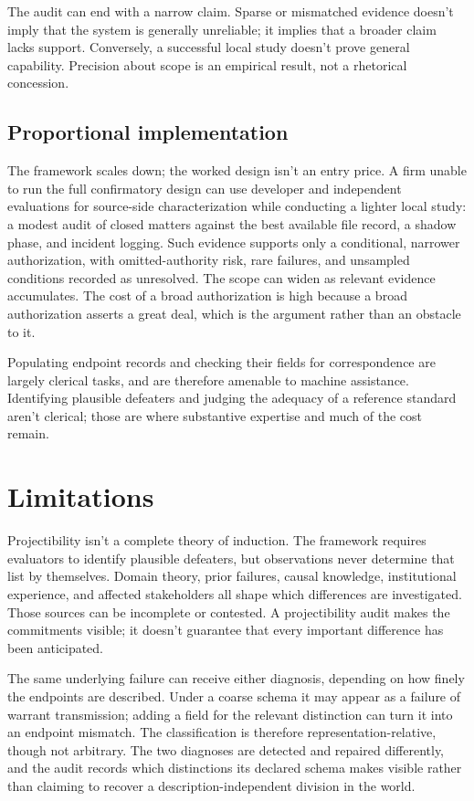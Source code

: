 \documentclass[12pt]{article}
\begin{document}
The audit can end with a narrow claim. Sparse or mismatched evidence doesn't imply that the system is generally unreliable; it implies that a broader claim lacks support. Conversely, a successful local study doesn't prove general capability. Precision about scope is an empirical result, not a rhetorical concession.

\subsection{Proportional implementation}\label{ssec:proportional}

The framework scales down; the worked design isn't an entry price. A firm unable to run the full confirmatory design can use developer and independent evaluations for source-side characterization while conducting a lighter local study: a modest audit of closed matters against the best available file record, a shadow phase, and incident logging. Such evidence supports only a conditional, narrower authorization, with omitted-authority risk, rare failures, and unsampled conditions recorded as unresolved. The scope can widen as relevant evidence accumulates. The cost of a broad authorization is high because a broad authorization asserts a great deal, which is the argument rather than an obstacle to it.

Populating endpoint records and checking their fields for correspondence are largely clerical tasks, and are therefore amenable to machine assistance. Identifying plausible defeaters and judging the adequacy of a reference standard aren't clerical; those are where substantive expertise and much of the cost remain.

\section{Limitations}\label{sec:limitations}

Projectibility isn't a complete theory of induction. The framework requires evaluators to identify plausible defeaters, but observations never determine that list by themselves. Domain theory, prior failures, causal knowledge, institutional experience, and affected stakeholders all shape which differences are investigated. Those sources can be incomplete or contested. A projectibility audit makes the commitments visible; it doesn't guarantee that every important difference has been anticipated.

The same underlying failure can receive either diagnosis, depending on how finely the endpoints are described. Under a coarse schema it may appear as a failure of warrant transmission; adding a field for the relevant distinction can turn it into an endpoint mismatch. The classification is therefore representation-relative, though not arbitrary. The two diagnoses are detected and repaired differently, and the audit records which distinctions its declared schema makes visible rather than claiming to recover a description-independent division in the world.
\end{document}
